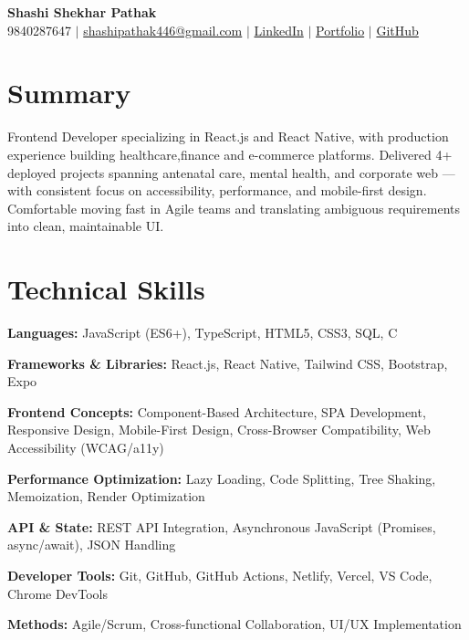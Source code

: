 \documentclass[letterpaper,10.5pt]{article}
\begin{document}
\begin{center}
  {\Huge \textbf{Shashi Shekhar Pathak}} \\[4pt]
  \small
  9840287647 \quad $|$ \quad
  \href{mailto:shashipathak446@gmail.com}{shashipathak446@gmail.com} \quad $|$ \quad
  \href{https://www.linkedin.com/in/shashi-s-pathak-0a667a337/}{LinkedIn} \quad $|$ \quad
  \href{https://shashi-shekhar-pathak-portfolio.netlify.app/}{Portfolio} \quad $|$ \quad
  \href{https://github.com/shashipathak007}{GitHub}
\end{center}

\section{Summary}
Frontend Developer specializing in React.js and React Native, with production experience building healthcare,finance and e-commerce platforms. Delivered 4+ deployed projects spanning antenatal care, mental health, and corporate web --- with consistent focus on accessibility, performance, and mobile-first design. Comfortable moving fast in Agile teams and translating ambiguous requirements into clean, maintainable UI.

\section{Technical Skills}
\begin{itemize}[leftmargin=0in, label={}, itemsep=1pt]
  \small{
    \item \textbf{Languages:} JavaScript (ES6+), TypeScript, HTML5, CSS3, SQL, C
    \item \textbf{Frameworks \& Libraries:} React.js, React Native, Tailwind CSS, Bootstrap, Expo
    \item \textbf{Frontend Concepts:} Component-Based Architecture, SPA Development, Responsive Design, Mobile-First Design, Cross-Browser Compatibility, Web Accessibility (WCAG/a11y)
    \item \textbf{Performance Optimization:} Lazy Loading, Code Splitting, Tree Shaking, Memoization, Render Optimization
    \item \textbf{API \& State:} REST API Integration, Asynchronous JavaScript (Promises, async/await), JSON Handling
    \item \textbf{Developer Tools:} Git, GitHub, GitHub Actions, Netlify, Vercel, VS Code, Chrome DevTools
    \item \textbf{Methods:} Agile/Scrum, Cross-functional Collaboration, UI/UX Implementation
  }
\end{itemize}
\vspace{-4pt}
\end{document}
